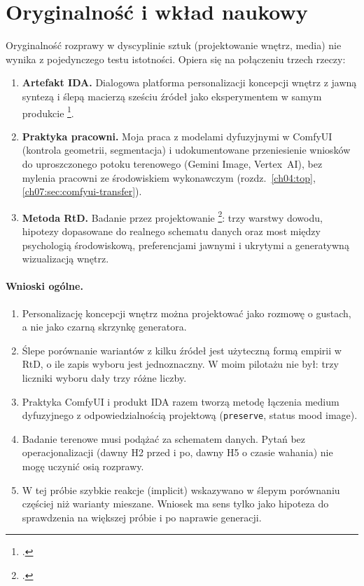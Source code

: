 \section{Oryginalność i wkład naukowy}
\label{ch10:sec:wklad}

Oryginalność rozprawy w dyscyplinie sztuk (projektowanie wnętrz, media) nie wynika z pojedynczego testu istotności. Opiera się na połączeniu trzech rzeczy:

\begin{enumerate}
  \item \textbf{Artefakt IDA.} Dialogowa platforma personalizacji koncepcji wnętrz z jawną syntezą i ślepą macierzą sześciu źródeł jako eksperymentem w samym produkcie \footcite{idaPlatform2026,zimmerman2007rtd}.
  \item \textbf{Praktyka pracowni.} Moja praca z modelami dyfuzyjnymi w ComfyUI (kontrola geometrii, segmentacja) i udokumentowane przeniesienie wniosków do uproszczonego potoku terenowego (Gemini Image, Vertex~AI), bez mylenia pracowni ze środowiskiem wykonawczym (rozdz.~\ref{ch04:top}, \ref{ch07:sec:comfyui-transfer}).
  \item \textbf{Metoda RtD.} Badanie przez projektowanie \footcite{frayling1993research}: trzy warstwy dowodu, hipotezy dopasowane do realnego schematu danych oraz most między psychologią środowiskową, preferencjami jawnymi i ukrytymi a generatywną wizualizacją wnętrz.
\end{enumerate}

\paragraph{Wnioski ogólne.}
\begin{enumerate}
  \item Personalizację koncepcji wnętrz można projektować jako rozmowę o gustach, a nie jako czarną skrzynkę generatora.
  \item Ślepe porównanie wariantów z kilku źródeł jest użyteczną formą empirii w RtD, o ile zapis wyboru jest jednoznaczny. W moim pilotażu nie był: trzy liczniki wyboru dały trzy różne liczby.
  \item Praktyka ComfyUI i produkt IDA razem tworzą metodę łączenia medium dyfuzyjnego z odpowiedzialnością projektową (\texttt{preserve}, status mood image).
  \item Badanie terenowe musi podążać za schematem danych. Pytań bez operacjonalizacji (dawny H2 przed i po, dawny H5 o czasie wahania) nie mogę uczynić osią rozprawy.
  \item W tej próbie szybkie reakcje (implicit) wskazywano w ślepym porównaniu częściej niż warianty mieszane. Wniosek ma sens tylko jako hipoteza do sprawdzenia na większej próbie i po naprawie generacji.
\end{enumerate}

